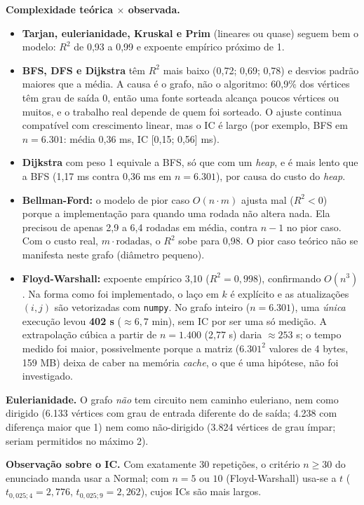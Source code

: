 \documentclass[10pt,a4paper,twocolumn]{article}
\begin{document}
\noindent\textbf{Complexidade teórica $\times$ observada.}
\begin{itemize}
\item \textbf{Tarjan, eulerianidade, Kruskal e Prim} (lineares ou quase) seguem bem o modelo: $R^2$ de 0,93 a 0,99 e expoente empírico próximo de 1.
\item \textbf{BFS, DFS e Dijkstra} têm $R^2$ mais baixo (0,72; 0,69; 0,78) e desvios padrão maiores que a média. A causa é o grafo, não o algoritmo: 60,9\% dos vértices têm grau de saída 0, então uma fonte sorteada alcança poucos vértices ou muitos, e o trabalho real depende de quem foi sorteado. O ajuste continua compatível com crescimento linear, mas o IC é largo (por exemplo, BFS em $n=6.301$: média 0,36 ms, IC [0,15; 0,56] ms).
\item \textbf{Dijkstra} com peso 1 equivale a BFS, só que com um \emph{heap}, e é mais lento que a BFS (1,17 ms contra 0,36 ms em $n=6.301$), por causa do custo do \emph{heap}.
\item \textbf{Bellman-Ford:} o modelo de pior caso $O(n\cdot m)$ ajusta mal ($R^2<0$) porque a implementação para quando uma rodada não altera nada. Ela precisou de apenas 2,9 a 6,4 rodadas em média, contra $n-1$ no pior caso. Com o custo real, $m\cdot\text{rodadas}$, o $R^2$ sobe para 0,98. O pior caso teórico não se manifesta neste grafo (diâmetro pequeno).
\item \textbf{Floyd-Warshall:} expoente empírico 3,10 ($R^2=0{,}998$), confirmando $O(n^3)$. Na forma como foi implementado, o laço em $k$ é explícito e as atualizações $(i,j)$ são vetorizadas com \texttt{numpy}. No grafo inteiro ($n=6.301$), uma \emph{única} execução levou \textbf{402 s} (${\approx}6{,}7$ min), sem IC por ser uma só medição. A extrapolação cúbica a partir de $n=1.400$ (2,77 s) daria ${\approx}253$ s; o tempo medido foi maior, possivelmente porque a matriz ($6.301^2$ valores de 4 bytes, 159 MB) deixa de caber na memória \emph{cache}, o que é uma hipótese, não foi investigado.
\end{itemize}
\noindent\textbf{Eulerianidade.} O grafo \emph{não} tem circuito nem caminho euleriano, nem como dirigido (6.133 vértices com grau de entrada diferente do de saída; 4.238 com diferença maior que 1) nem como não-dirigido (3.824 vértices de grau ímpar; seriam permitidos no máximo 2).

\noindent\textbf{Observação sobre o IC.} Com exatamente 30 repetições, o critério $n\ge30$ do enunciado manda usar a Normal; com $n=5$ ou $10$ (Floyd-Warshall) usa-se a $t$ ($t_{0{,}025;4}=2{,}776$, $t_{0{,}025;9}=2{,}262$), cujos ICs são mais largos.
\end{document}
